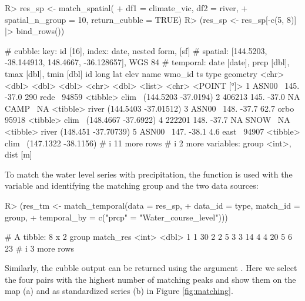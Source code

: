 \documentclass[
  shortnames]{jss}
\begin{document}
\begin{CodeChunk}
\begin{CodeInput}
R> res_sp <- match_spatial(
+   df1 = climate_vic, df2 = river, 
+   spatial_n_group = 10, return_cubble = TRUE)
R> (res_sp <- res_sp[-c(5, 8)] |> bind_rows())
\end{CodeInput}
\begin{CodeOutput}
# cubble:   key: id [16], index: date, nested form, [sf]
# spatial:  [144.5203, -38.144913, 148.4667, -36.128657], WGS 84
# temporal: date [date], prcp [dbl], tmax [dbl], tmin [dbl]
  id      long   lat  elev name  wmo_id ts       type              geometry
  <chr>  <dbl> <dbl> <dbl> <chr>  <dbl> <list>   <chr>          <POINT [°]>
1 ASN00~  145. -37.0 290   rede~  94859 <tibble> clim~  (144.5203 -37.0194)
2 406213  145. -37.0  NA   CAMP~     NA <tibble> river (144.5403 -37.01512)
3 ASN00~  148. -37.7  62.7 orbo~  95918 <tibble> clim~  (148.4667 -37.6922)
4 222201  148. -37.7  NA   SNOW~     NA <tibble> river  (148.451 -37.70739)
5 ASN00~  147. -38.1   4.6 east~  94907 <tibble> clim~  (147.1322 -38.1156)
# i 11 more rows
# i 2 more variables: group <int>, dist [m]
\end{CodeOutput}
\end{CodeChunk}

To match the water level series with precipitation, the function  is used with the variable  and  identifying the matching group and the two data sources:

\begin{CodeChunk}
\begin{CodeInput}
R> (res_tm <- match_temporal(data = res_sp,
+                           data_id = type, match_id = group,
+                           temporal_by = c("prcp" = "Water_course_level")))
\end{CodeInput}
\begin{CodeOutput}
# A tibble: 8 x 2
  group match_res
  <int>     <dbl>
1     1        30
2     2         5
3     3        14
4     4        20
5     6        23
# i 3 more rows
\end{CodeOutput}
\end{CodeChunk}

Similarly, the cubble output can be returned using the argument . Here we select the four pairs with the highest number of matching peaks and show them on the map (a) and as standardized series (b) in Figure \ref{fig:matching}.
\end{document}
